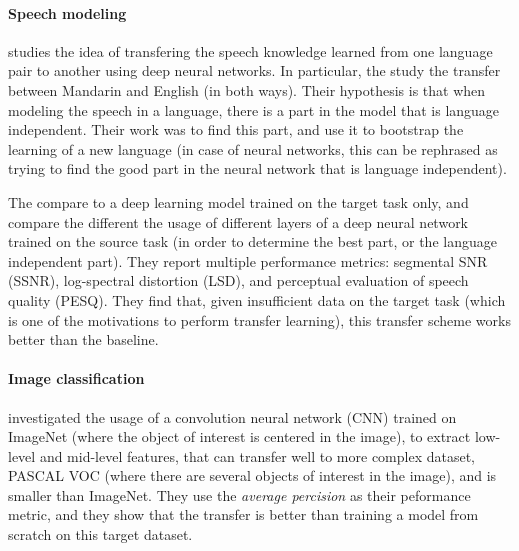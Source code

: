     \paragraph{Speech modeling}
    \citep{xu2014cross} studies the idea of transfering the speech knowledge learned from one language pair to another using deep neural networks. In particular, the study the transfer between Mandarin and English (in both ways). Their hypothesis is that when modeling the speech in a language, there is a part in the model that is language independent. Their work was to find this part, and use it to bootstrap the learning of a new language (in case of neural networks, this can be rephrased as trying to find the good part in the neural network that is language independent).

    The compare to a deep learning model trained on the target task only, and compare the different the usage of different layers of a deep neural network trained on the source task (in order to determine the best part, or the language independent part). They report multiple performance metrics: segmental SNR (SSNR), log-spectral distortion (LSD), and perceptual evaluation of speech quality (PESQ). They find that, given insufficient data on the target task (which is one of the motivations to perform transfer learning), this transfer scheme works better than the baseline.

    \paragraph{Image classification}
    \citep{oquab2014learning} investigated the usage of a convolution neural network (CNN) trained on ImageNet \citep{imagenet_cvpr09} (where the object of interest is centered in the image), to extract low-level and mid-level features, that can transfer well to more complex dataset, PASCAL VOC \citep{everingham2010pascal} (where there are several objects of interest in the image), and is smaller than ImageNet. They use the \textit{average percision} as their peformance metric, and they show that the transfer is better than training a model from scratch on this target dataset.

